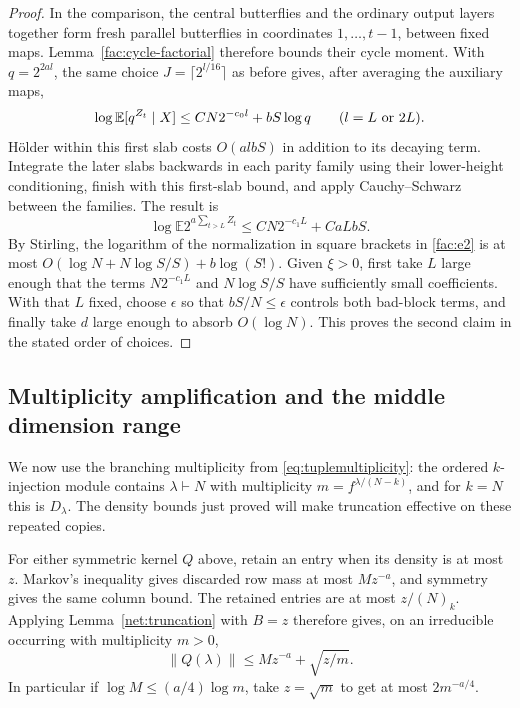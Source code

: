 \begin{proof}
In the comparison, the central butterflies and the ordinary output
layers together form fresh parallel butterflies in coordinates
$1,\ldots,t-1$, between fixed maps. Lemma~\ref{fac:cycle-factorial}
therefore bounds their cycle moment. With $q=2^{2al}$, the same choice
$J=\lceil2^{l/16}\rceil$ as before gives, after averaging the auxiliary
maps,
\[
 \log\mathbb E[q^{Z_t}\mid X]
 \le CN2^{-c_0l}+bS\log q
 \qquad(l=L\hbox{ or }2L).
\]
H\"older within this first slab costs $O(a l bS)$ in addition to its
decaying term. Integrate the later slabs backwards in each parity family
using their lower-height conditioning, finish with this first-slab
bound, and apply Cauchy--Schwarz between the families. The result is
\[
 \log\mathbb E 2^{a\sum_{t>L}Z_t}
 \le C N 2^{-c_1 L} + C a L bS .
\]
By Stirling, the logarithm of the normalization in square brackets in
\eqref{fac:e2} is at most
$O(\log N+N\log S/S)+b\log(S!)$. Given $\xi>0$, first take $L$
large enough that the terms $N2^{-c_1L}$ and $N\log S/S$ have sufficiently
small coefficients. With that $L$ fixed, choose $\epsilon$ so that
$bS/N\le\epsilon$ controls both bad-block terms, and finally take $d$
large enough to absorb $O(\log N)$. This proves the second claim in the
stated order of choices.
\end{proof}

\subsection{Multiplicity amplification and the middle dimension range}
We now use the branching multiplicity from
\eqref{eq:tuplemultiplicity}: the ordered $k$-injection module contains
$\lambda\vdash N$ with multiplicity $m=f^{\lambda/(N-k)}$, and for
$k=N$ this is $D_\lambda$. The density bounds just proved will make
truncation effective on these repeated copies.

For either symmetric kernel $Q$ above, retain an entry when its density
is at most $z$. Markov's inequality gives discarded row mass at most
$Mz^{-a}$, and symmetry gives the same column bound. The retained
entries are at most $z/(N)_k$. Applying
Lemma~\ref{net:truncation} with $B=z$ therefore gives, on an irreducible
occurring with multiplicity $m>0$,
\begin{equation}
 \|Q(\lambda)\|\le Mz^{-a}+\sqrt{z/m}.
 \label{fac:e7}
\end{equation}
In particular if $\log M\le (a/4)\log m$, take $z=\sqrt m$ to get at most $2m^{-a/4}$.

